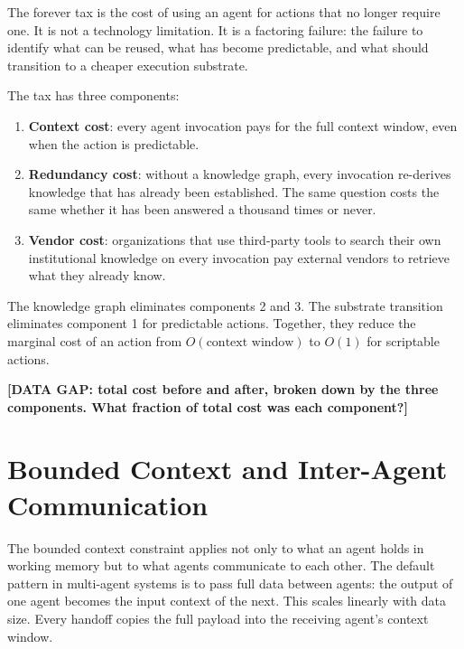 \documentclass[11pt]{article}
\theoremstyle{definition}
\begin{document}
The forever tax is the cost of using an agent for actions that no
longer require one. It is not a technology limitation. It is a
factoring failure: the failure to identify what can be reused, what
has become predictable, and what should transition to a cheaper
execution substrate.

The tax has three components:

\begin{enumerate}
\item \textbf{Context cost}: every agent invocation pays for the full
   context window, even when the action is predictable.

\item \textbf{Redundancy cost}: without a knowledge graph, every
   invocation re-derives knowledge that has already been established.
   The same question costs the same whether it has been answered a
   thousand times or never.

\item \textbf{Vendor cost}: organizations that use third-party tools to
   search their own institutional knowledge on every invocation pay
   external vendors to retrieve what they already know.
\end{enumerate}

The knowledge graph eliminates components 2 and 3. The substrate
transition eliminates component 1 for predictable actions. Together,
they reduce the marginal cost of an action from
$O(\text{context window})$ to $O(1)$ for scriptable actions.

\textbf{[DATA GAP: total cost before and after, broken down by the
three components. What fraction of total cost was each component?]}

\section{Bounded Context and Inter-Agent Communication}
\label{sec:mapreduce}

The bounded context constraint applies not only to what an agent holds
in working memory but to what agents communicate to each other. The
default pattern in multi-agent systems is to pass full data between
agents: the output of one agent becomes the input context of the next.
This scales linearly with data size. Every handoff copies the full
payload into the receiving agent's context window.
\end{document}
